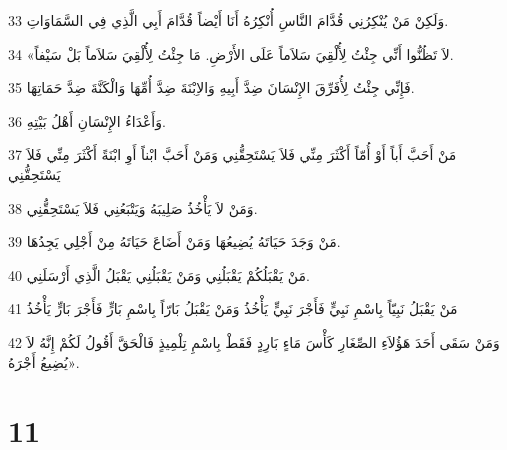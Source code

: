 \par 33 وَلَكِنْ مَنْ يُنْكِرُنِي قُدَّامَ النَّاسِ أُنْكِرُهُ أَنَا أَيْضاً قُدَّامَ أَبِي الَّذِي فِي السَّمَاوَاتِ.
\par 34 «لاَ تَظُنُّوا أَنِّي جِئْتُ لِأُلْقِيَ سَلاَماً عَلَى الأَرْضِ. مَا جِئْتُ لِأُلْقِيَ سَلاَماً بَلْ سَيْفاً.
\par 35 فَإِنِّي جِئْتُ لِأُفَرِّقَ الإِنْسَانَ ضِدَّ أَبِيهِ وَالاِبْنَةَ ضِدَّ أُمِّهَا وَالْكَنَّةَ ضِدَّ حَمَاتِهَا.
\par 36 وَأَعْدَاءُ الإِنْسَانِ أَهْلُ بَيْتِهِ.
\par 37 مَنْ أَحَبَّ أَباً أَوْ أُمّاً أَكْثَرَ مِنِّي فَلاَ يَسْتَحِقُّنِي وَمَنْ أَحَبَّ ابْناً أَوِ ابْنَةً أَكْثَرَ مِنِّي فَلاَ يَسْتَحِقُّنِي
\par 38 وَمَنْ لاَ يَأْخُذُ صَلِيبَهُ وَيَتْبَعُنِي فَلاَ يَسْتَحِقُّنِي.
\par 39 مَنْ وَجَدَ حَيَاتَهُ يُضِيعُهَا وَمَنْ أَضَاعَ حَيَاتَهُ مِنْ أَجْلِي يَجِدُهَا.
\par 40 مَنْ يَقْبَلُكُمْ يَقْبَلُنِي وَمَنْ يَقْبَلُنِي يَقْبَلُ الَّذِي أَرْسَلَنِي.
\par 41 مَنْ يَقْبَلُ نَبِيّاً بِاسْمِ نَبِيٍّ فَأَجْرَ نَبِيٍّ يَأْخُذُ وَمَنْ يَقْبَلُ بَارّاً بِاسْمِ بَارٍّ فَأَجْرَ بَارٍّ يَأْخُذُ
\par 42 وَمَنْ سَقَى أَحَدَ هَؤُلاَءِ الصِّغَارِ كَأْسَ مَاءٍ بَارِدٍ فَقَطْ بِاسْمِ تِلْمِيذٍ فَالْحَقَّ أَقُولُ لَكُمْ إِنَّهُ لاَ يُضِيعُ أَجْرَهُ».

\chapter{11}

